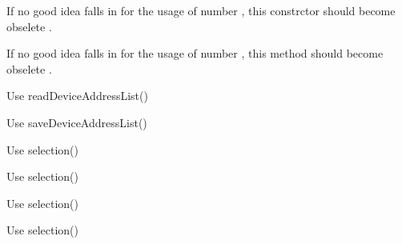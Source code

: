 
\begin{DoxyRefList}
\item[\label{deprecated__deprecated000011}%
\hypertarget{deprecated__deprecated000011}{}%
Member \hyperlink{classmdt_error_a377c175cc8e1aeae543cae2ecc5ca87b}{mdt\-Error\-:\-:mdt\-Error} (int number, const Q\-String \&text, level\-\_\-t level)]If no good idea falls in for the usage of number , this constrctor should become obselete .  
\item[\label{deprecated__deprecated000012}%
\hypertarget{deprecated__deprecated000012}{}%
Member \hyperlink{classmdt_error_ad233adb8efe4180b85f584c5afdd49fc}{mdt\-Error\-:\-:number} () const ]If no good idea falls in for the usage of number , this method should become obselete .  
\item[\label{deprecated__deprecated000009}%
\hypertarget{deprecated__deprecated000009}{}%
Member \hyperlink{classmdt_modbus_tcp_port_manager_ab4d0a994973af6008faf489ca9ddb03d}{mdt\-Modbus\-Tcp\-Port\-Manager\-:\-:read\-Scan\-Result} ()]Use read\-Device\-Address\-List()  
\item[\label{deprecated__deprecated000008}%
\hypertarget{deprecated__deprecated000008}{}%
Member \hyperlink{classmdt_modbus_tcp_port_manager_a3a1f5a54c93fa90ba83dea8785407da3}{mdt\-Modbus\-Tcp\-Port\-Manager\-:\-:save\-Scan\-Result} (const Q\-List$<$ mdt\-Port\-Info $\ast$ $>$ scan\-Result)]Use save\-Device\-Address\-List()  
\item[\label{deprecated__deprecated000003}%
\hypertarget{deprecated__deprecated000003}{}%
Member \hyperlink{classmdt_sql_selection_dialog_ae5582bd717078a137dd71d5a1b9cc9f9}{mdt\-Sql\-Selection\-Dialog\-:\-:add\-Selection\-Result\-Column} (const Q\-String \&field)]Use selection()  
\item[\label{deprecated__deprecated000007}%
\hypertarget{deprecated__deprecated000007}{}%
Member \hyperlink{classmdt_sql_selection_dialog_aab4943bc01e64f867791c15eea613e23}{mdt\-Sql\-Selection\-Dialog\-:\-:selected\-Data} (int row, const Q\-String \&field\-Name)]Use selection()  
\item[\label{deprecated__deprecated000004}%
\hypertarget{deprecated__deprecated000004}{}%
Member \hyperlink{classmdt_sql_selection_dialog_affdf9a9936509c8b6ca141b8ff415995}{mdt\-Sql\-Selection\-Dialog\-:\-:selected\-Data\-Record} ()]Use selection()  
\item[\label{deprecated__deprecated000005}%
\hypertarget{deprecated__deprecated000005}{}%
Member \hyperlink{classmdt_sql_selection_dialog_a23592c799f3b8945b3f5e72082dc265b}{mdt\-Sql\-Selection\-Dialog\-:\-:selection\-Result} ()]Use selection()  

\end{DoxyRefList}
